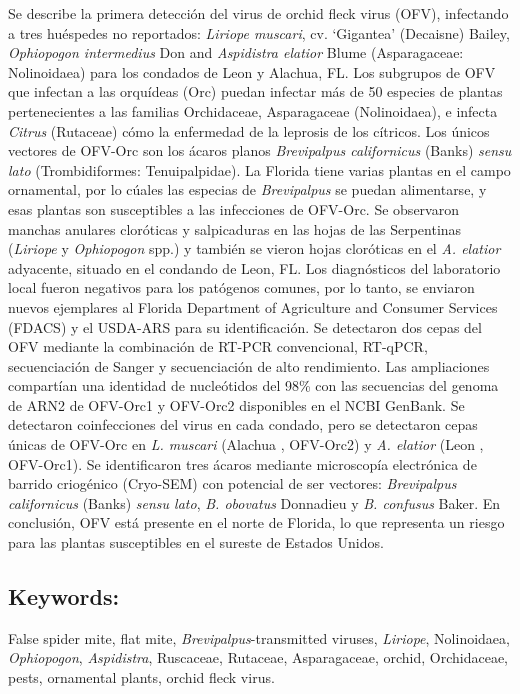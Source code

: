 \documentclass[12pt,final,CPage]{ufthesis}
\begin{document}
{  Se describe la primera detección del virus de orchid fleck virus (OFV), infectando a tres huéspedes no reportados: \emph{Liriope muscari}, cv. `Gigantea' (Decaisne) Bailey, \emph{Ophiopogon intermedius} Don and \emph{Aspidistra elatior} Blume (Asparagaceae: Nolinoidaea) para los condados de Leon y Alachua, FL. Los subgrupos de OFV que infectan a las orquídeas (Orc) puedan infectar más de 50 especies de plantas pertenecientes a las familias Orchidaceae, Asparagaceae (Nolinoidaea), e infecta \emph{Citrus} (Rutaceae) cómo la enfermedad de la leprosis de los cítricos. Los únicos vectores de OFV-Orc son los ácaros planos \emph{Brevipalpus californicus} (Banks) \emph{sensu lato} (Trombidiformes: Tenuipalpidae). La Florida tiene varias plantas en el campo ornamental, por lo cúales las especias de \emph{Brevipalpus} se puedan alimentarse, y esas plantas son susceptibles a las infecciones de OFV-Orc. Se observaron manchas anulares cloróticas y salpicaduras en las hojas de las Serpentinas (\emph{Liriope} y \emph{Ophiopogon} spp.) y también se vieron hojas cloróticas en el \emph{A. elatior} adyacente, situado en el condando de Leon, FL. Los diagnósticos del laboratorio local fueron negativos para los patógenos comunes, por lo tanto, se enviaron nuevos ejemplares al Florida Department of Agriculture and Consumer Services (FDACS) y el USDA-ARS para su identificación. Se detectaron dos cepas del OFV mediante la combinación de RT-PCR convencional, RT-qPCR, secuenciación de Sanger y secuenciación de alto rendimiento. Las ampliaciones compartían una identidad de nucleótidos del 98\% con las secuencias del genoma de ARN2 de OFV-Orc1 y OFV-Orc2 disponibles en el NCBI GenBank. Se detectaron coinfecciones del virus en cada condado, pero se detectaron cepas únicas de OFV-Orc en \emph{L. muscari} (Alachua , OFV-Orc2) y \emph{A. elatior} (Leon , OFV-Orc1). Se identificaron tres ácaros mediante microscopía electrónica de barrido criogénico (Cryo-SEM) con potencial de ser vectores: \emph{Brevipalpus californicus} (Banks) \emph{sensu lato}, \emph{B. obovatus} Donnadieu y \emph{B. confusus} Baker. En conclusión, OFV está presente en el norte de Florida, lo que representa un riesgo para las plantas susceptibles en el sureste de Estados Unidos.

  \hypertarget{keywords}{%
  \subsection{Keywords:}\label{keywords}}

  False spider mite, flat mite, \emph{Brevipalpus}-transmitted viruses, \emph{Liriope}, Nolinoidaea, \emph{Ophiopogon}, \emph{Aspidistra}, Ruscaceae, Rutaceae, Asparagaceae, orchid, Orchidaceae, pests, ornamental plants, orchid fleck virus.

}
\end{document}

